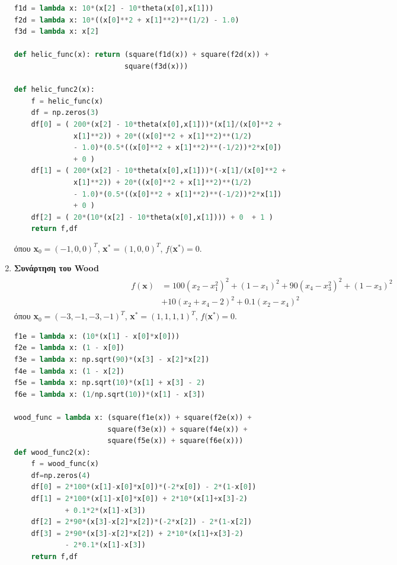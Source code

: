 \documentclass[a4paper,12pt,twoside]{report}
\theoremstyle{plain}
\theoremstyle{definition}
\theoremstyle{remark}
\begin{document}
\begin{enumerate}
\begin{lstlisting}[extendedchars=true,caption="Η συνάρτηση Helical valey σε κώδικα Python",language=python]
f1d = lambda x: 10*(x[2] - 10*theta(x[0],x[1]))
f2d = lambda x: 10*((x[0]**2 + x[1]**2)**(1/2) - 1.0)
f3d = lambda x: x[2]

def helic_func(x): return (square(f1d(x)) + square(f2d(x)) + 
						  square(f3d(x)))

def helic_func2(x):
    f = helic_func(x)
    df = np.zeros(3)
    df[0] = ( 200*(x[2] - 10*theta(x[0],x[1]))*(x[1]/(x[0]**2 + 
    		  x[1]**2)) + 20*((x[0]**2 + x[1]**2)**(1/2) 
              - 1.0)*(0.5*((x[0]**2 + x[1]**2)**(-1/2))*2*x[0])
              + 0 )
    df[1] = ( 200*(x[2] - 10*theta(x[0],x[1]))*(-x[1]/(x[0]**2 + 
    		  x[1]**2)) + 20*((x[0]**2 + x[1]**2)**(1/2) 
              - 1.0)*(0.5*((x[0]**2 + x[1]**2)**(-1/2))*2*x[1])        
              + 0 )
    df[2] = ( 20*(10*(x[2] - 10*theta(x[0],x[1]))) + 0  + 1 )
    return f,df
\end{lstlisting}

όπου  \textbf{x}$_0 = (-1,0,0)^T$,\hspace{0.1cm} \textbf{x}$^*=(1, 0,0)^T$, \hspace{0.1cm} $f($\textbf{x}$^*)=0$.

\item \textbf{Συνάρτηση του Wood}
\begin{align}
\begin{split}
f(\textbf{x}) &= 100(x_2-x_1^2)^2+(1-x_1)^2+90(x_4-x_3^2)^2+(1-x_3)^2 \\
&+10(x_2+x_4-2)^2 + 0.1(x_2-x_4)^2
\end{split}
\end{align}
όπου  \textbf{x}$_0 = (-3,-1,-3,-1)^T$,\hspace{0.1cm} \textbf{x}$^*=(1,1,1,1)^T$, \hspace{0.1cm} $f($\textbf{x}$^*)=0$.
\begin{lstlisting}[extendedchars=true,caption="Η συνάρτηση Wood σε κώδικα Python",language=python]
f1e = lambda x: (10*(x[1] - x[0]*x[0]))
f2e = lambda x: (1 - x[0])
f3e = lambda x: np.sqrt(90)*(x[3] - x[2]*x[2])
f4e = lambda x: (1 - x[2])
f5e = lambda x: np.sqrt(10)*(x[1] + x[3] - 2)
f6e = lambda x: (1/np.sqrt(10))*(x[1] - x[3])

wood_func = lambda x: (square(f1e(x)) + square(f2e(x)) + 
					  square(f3e(x)) + square(f4e(x)) + 
                      square(f5e(x)) + square(f6e(x)))
def wood_func2(x):
    f = wood_func(x)
    df=np.zeros(4)
    df[0] = 2*100*(x[1]-x[0]*x[0])*(-2*x[0]) - 2*(1-x[0])
    df[1] = 2*100*(x[1]-x[0]*x[0]) + 2*10*(x[1]+x[3]-2) 
    		+ 0.1*2*(x[1]-x[3])
    df[2] = 2*90*(x[3]-x[2]*x[2])*(-2*x[2]) - 2*(1-x[2])
    df[3] = 2*90*(x[3]-x[2]*x[2]) + 2*10*(x[1]+x[3]-2) 
    		- 2*0.1*(x[1]-x[3])
    return f,df
\end{lstlisting}


\end{enumerate}
\end{document}
